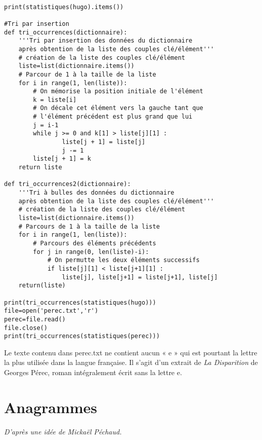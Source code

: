 \begin{solution}~\
\begin{verbatim}
print(statistiques(hugo).items())

#Tri par insertion
def tri_occurrences(dictionnaire):
    '''Tri par insertion des données du dictionnaire
    après obtention de la liste des couples clé/élément'''
    # création de la liste des couples clé/élément
    liste=list(dictionnaire.items())
    # Parcour de 1 à la taille de la liste
    for i in range(1, len(liste)):
        # On mémorise la position initiale de l'élément
        k = liste[i]
        # On décale cet élément vers la gauche tant que
        # l'élément précédent est plus grand que lui
        j = i-1
        while j >= 0 and k[1] > liste[j][1] :
                liste[j + 1] = liste[j]
                j -= 1
        liste[j + 1] = k
    return liste

def tri_occurrences2(dictionnaire):
    '''Tri à bulles des données du dictionnaire
    après obtention de la liste des couples clé/élément'''
    # création de la liste des couples clé/élément
    liste=list(dictionnaire.items())
    # Parcours de 1 à la taille de la liste
    for i in range(1, len(liste)):
        # Parcours des éléments précédents
        for j in range(0, len(liste)-i):
            # On permutte les deux éléments successifs
            if liste[j][1] < liste[j+1][1] :
                liste[j], liste[j+1] = liste[j+1], liste[j]
    return(liste)

print(tri_occurrences(statistiques(hugo)))
file=open('perec.txt','r')
perec=file.read()
file.close()
print(tri_occurrences(statistiques(perec)))
\end{verbatim}

Le texte contenu dans perec.txt ne contient aucun « e » qui est pourtant la lettre la plus utilisée dans la langue française. Il s'agit d'un extrait de \textit{La Disparition} de Georges Pérec, roman intégralement écrit sans la lettre e.
\end{solution}

\newpage
\section{Anagrammes}
\vspace{-\baselineskip}
\begin{footnotesize}\textit{D'après une idée de Mickaël Péchaud.}\end{footnotesize}
\vspace{\baselineskip}

